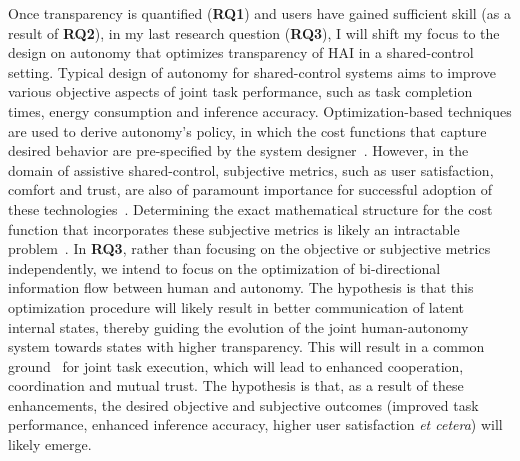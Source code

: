 \documentclass[12pt]{article}
\begin{document}
Once transparency is quantified (\textbf{RQ1}) and users have gained sufficient skill (as a result of \textbf{RQ2}), in my last research question (\textbf{RQ3}), I will shift my focus to the design on autonomy that optimizes transparency of HAI in a shared-control setting. Typical design of autonomy for shared-control systems aims to improve various objective aspects of joint task performance, such as task completion times, energy consumption and inference accuracy. Optimization-based techniques are used to derive autonomy's policy, in which the cost functions that capture desired behavior are pre-specified by the system designer~\cite{javdani2015shared}. However, in the domain of assistive shared-control, subjective metrics, such as user satisfaction, comfort and trust, are also of paramount importance for successful adoption of these technologies~\cite{kim2012autonomy}. Determining the exact mathematical structure for the cost function that incorporates these subjective metrics is likely an intractable problem~\cite{gopinath2017human}. In \textbf{RQ3}, rather than focusing on the objective or subjective metrics independently, we intend to focus on the optimization of bi-directional information flow between human and autonomy. The hypothesis is that this optimization procedure will likely result in better communication of latent internal states, thereby guiding the evolution of the joint human-autonomy system towards states with higher transparency. This will result in a common ground~\cite{kiesler2005fostering} for joint task execution, which will lead to enhanced cooperation, coordination and mutual trust. The hypothesis is that, as a result of these enhancements, the desired objective and subjective outcomes (improved task performance, enhanced inference accuracy, higher user satisfaction \textit{et cetera}) will likely emerge.
\end{document}
